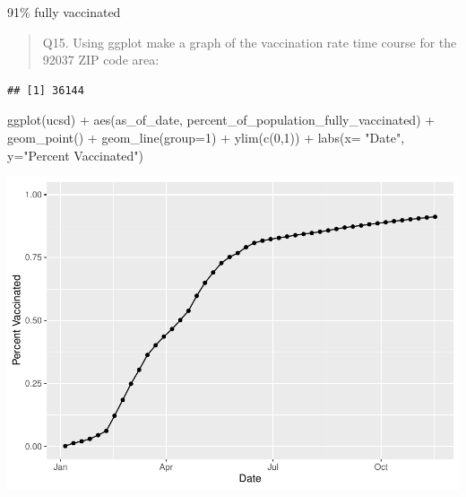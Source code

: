 \documentclass[
]{article}
\newenvironment{Shaded}{\begin{snugshade}}{\end{snugshade}}
\newcommand{\AttributeTok}[1]{\textcolor[rgb]{0.77,0.63,0.00}{#1}}
\newcommand{\DecValTok}[1]{\textcolor[rgb]{0.00,0.00,0.81}{#1}}
\newcommand{\FunctionTok}[1]{\textcolor[rgb]{0.00,0.00,0.00}{#1}}
\newcommand{\NormalTok}[1]{#1}
\newcommand{\OtherTok}[1]{\textcolor[rgb]{0.56,0.35,0.01}{#1}}
\newcommand{\SpecialCharTok}[1]{\textcolor[rgb]{0.00,0.00,0.00}{#1}}
\newcommand{\StringTok}[1]{\textcolor[rgb]{0.31,0.60,0.02}{#1}}
\begin{document}
91\% fully vaccinated

\begin{quote}
Q15. Using ggplot make a graph of the vaccination rate time course for
the 92037 ZIP code area:
\end{quote}

\begin{Shaded}
\end{Shaded}

\begin{verbatim}
## [1] 36144
\end{verbatim}

\begin{Shaded}
\begin{Highlighting}[]
\FunctionTok{ggplot}\NormalTok{(ucsd) }\SpecialCharTok{+}
  \FunctionTok{aes}\NormalTok{(as\_of\_date,}
\NormalTok{      percent\_of\_population\_fully\_vaccinated) }\SpecialCharTok{+}
  \FunctionTok{geom\_point}\NormalTok{() }\SpecialCharTok{+}
  \FunctionTok{geom\_line}\NormalTok{(}\AttributeTok{group=}\DecValTok{1}\NormalTok{) }\SpecialCharTok{+}
  \FunctionTok{ylim}\NormalTok{(}\FunctionTok{c}\NormalTok{(}\DecValTok{0}\NormalTok{,}\DecValTok{1}\NormalTok{)) }\SpecialCharTok{+}
  \FunctionTok{labs}\NormalTok{(}\AttributeTok{x=} \StringTok{"Date"}\NormalTok{, }\AttributeTok{y=}\StringTok{"Percent Vaccinated"}\NormalTok{)}
\end{Highlighting}
\end{Shaded}

\includegraphics{Vaccine-rate-mini-project_files/figure-latex/unnamed-chunk-29-1.pdf}
\end{document}
